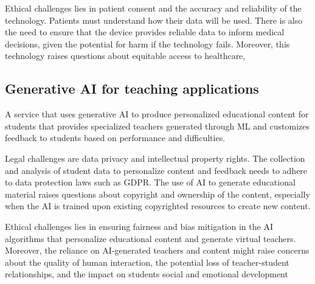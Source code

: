 \documentclass[a4paper]{article}
\begin{document}
Ethical challenges lies in patient consent and the accuracy and reliability of the technology. Patients must understand how their data will be used. There is also the need to ensure that the device provides reliable data to inform medical decisions, given the potential for harm if the technology fails. Moreover, this technology raises questions about equitable access to healthcare,

\subsection{Generative AI for teaching applications}

A service that uses generative AI to produce personalized educational content for students that provides specialized teachers generated through ML and customizes feedback to students based on performance and difficulties. 

Legal challenges are data privacy and intellectual property rights. The collection and analysis of student data to personalize content and feedback needs to adhere to data protection laws such as GDPR. The use of AI to generate educational material raises questions about copyright and ownership of the content, especially when the AI is trained upon existing copyrighted resources to create new content.

Ethical challenges lies in ensuring fairness and bias mitigation in the AI algorithms that personalize educational content and generate virtual teachers. Moreover, the reliance on AI-generated teachers and content might raise concerns about the quality of human interaction, the potential loss of teacher-student relationships, and the impact on students social and emotional development
\end{document}
